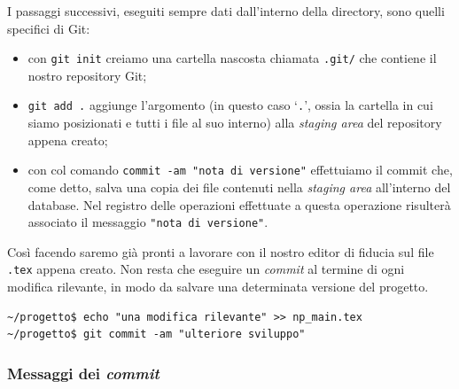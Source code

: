 \documentclass[a4paper,12pt,oneside]{article}
\begin{document}
I passaggi successivi, eseguiti sempre dati dall'interno della directory, sono
quelli specifici di Git:
\begin{itemize}
\item con \lstinline|git init| creiamo una cartella nascosta chiamata
  \lstinline|.git/| che contiene il nostro repository Git;
\item \lstinline|git add .| aggiunge l'argomento (in questo caso `\lstinline|.|',
  ossia la cartella in cui siamo posizionati e tutti i file al suo interno) alla
  \emph{staging area} del repository appena creato;
\item con col comando \lstinline|commit -am "nota di versione"| effettuiamo il
  commit che, come detto, salva una copia dei file contenuti nella \emph{staging
    area} all'interno del database. Nel registro delle operazioni effettuate a
  questa operazione risulterà associato il messaggio \lstinline|"nota di versione"|.
\end{itemize}

Così facendo saremo già pronti a lavorare con il nostro editor di fiducia sul
file \lstinline|.tex| appena creato.
Non resta che eseguire un \emph{commit} al termine di ogni modifica rilevante,
in modo da salvare una determinata versione del progetto.
\begin{lstlisting}
~/progetto$ echo "una modifica rilevante" >> np_main.tex
~/progetto$ git commit -am "ulteriore sviluppo"
\end{lstlisting}

\subsubsection{Messaggi dei \emph{commit}}
\label{sec:messaggi-commit}
\end{document}
